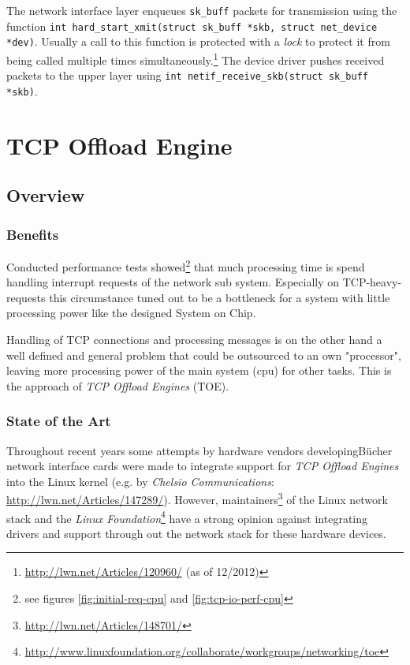 The network interface layer enqueues \texttt{sk\_buff} packets for transmission using the function \texttt{int hard\_start\_xmit(struct sk\_buff *skb, struct net\_device *dev)}. Usually a call to this function is protected with a \textit{lock} to protect it from being called multiple times simultaneously.\footnote{\url{http://lwn.net/Articles/120960/} (as of 12/2012)} The device driver pushes received packets to the upper layer using \texttt{int netif\_receive\_skb(struct sk\_buff *skb)}. \cite{netstackana}

\chapter{TCP Offload Engine}

\section{Overview}

\subsection{Benefits}

Conducted performance tests showed\footnote{see figures \ref{fig:initial-req-cpu} and \ref{fig:tcp-io-perf-cpu}} that much processing time is spend handling interrupt requests of the network sub system. Especially on TCP-heavy-requests this circumstance tuned out to be a bottleneck for a system with little processing power like the designed System on Chip.

Handling of TCP connections and processing messages is on the other hand a well defined and general problem that could be outsourced to an own "processor", leaving more processing power of the main system (\gls{cpu}) for other tasks. This is the approach of \textit{TCP Offload Engines} (TOE).
\\

\subsection{State of the Art}

Throughout recent years some attempts by hardware vendors developingBücher network interface cards were made to integrate support for \textit{TCP Offload Engines} into the Linux kernel (e.g. by \textit{Chelsio Communications}: \url{http://lwn.net/Articles/147289/}). However, maintainers\footnote{\url{http://lwn.net/Articles/148701/}} of the Linux network stack and the \textit{Linux Foundation}\footnote{\url{http://www.linuxfoundation.org/collaborate/workgroups/networking/toe}} have a strong opinion against integrating drivers and support through out the network stack for these hardware devices.


